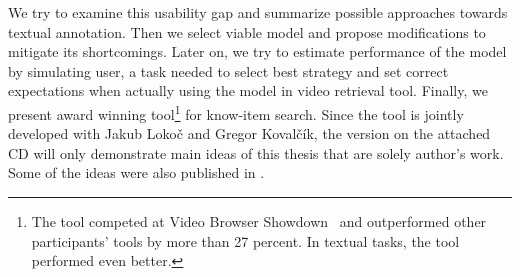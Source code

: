 We try to examine this usability gap and summarize possible approaches towards textual annotation. Then we select viable model and propose modifications to mitigate its shortcomings. Later on, we try to estimate performance of the model by simulating user, a task needed to select best strategy and set correct expectations when actually using the model in video retrieval tool. Finally, we present award winning tool\footnote{The tool competed at Video Browser Showdown~\cite{cobarzan2017interactive} and outperformed other participants' tools by more than 27 percent. In textual tasks, the tool performed even better.} for know-item search. Since the tool is jointly developed with Jakub Lokoč and Gregor Kovalčík, the version on the attached CD will only demonstrate main ideas of this thesis that are solely author's work. Some of the ideas were also published in \cite{lokovc2018revisiting, LokocLSC}.

